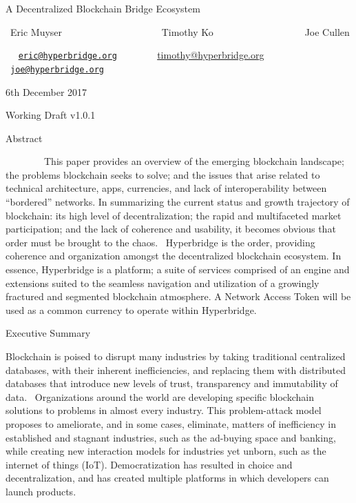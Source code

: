 \documentclass[]{article}
\date{}
\begin{document}
{A Decentralized Blockchain Bridge Ecosystem}

{}

{~Eric Muyser ~ ~ ~ ~ ~ ~ ~ ~ ~ ~ ~ ~ Timothy Ko ~ ~ ~ ~ ~ ~ ~ ~ ~ ~ ~
Joe Cullen}

{~
~}{\href{mailto:eric@hyperbridge.org}{\nolinkurl{eric@hyperbridge.org}}}{~
~ ~ ~ ~ }{\href{mailto:tim@hyperbridge.org}{timothy@hyperbridge.org}}{~
~ ~ ~
~}{\href{mailto:joe@hyperbridge.org}{\nolinkurl{joe@hyperbridge.org}}}{~}

{}

{6th December 2017}

{Working Draft v1.0.1}

{}

{Abstract}

{}

{~~~~~~~~This paper provides an overview of the emerging blockchain
landscape; the problems blockchain seeks to solve; and the issues that
arise related to technical architecture, apps, currencies, and lack of
interoperability between ``bordered'' networks. In summarizing the
current status and growth trajectory of blockchain: its high level of
decentralization; the rapid and multifaceted market participation; and
the lack of coherence and usability, it becomes obvious that order must
be brought to the chaos. ~Hyperbridge is the order, providing coherence
and organization amongst the decentralized blockchain ecosystem. In
essence, Hyperbridge is a platform; a suite of services comprised of an
engine and extensions suited to the seamless navigation and utilization
of a growingly fractured and segmented blockchain atmosphere. A Network
Access Token will be used as a common currency to operate within
Hyperbridge.}

{}

{Executive Summary}

{}

{Blockchain is poised to disrupt many industries by taking traditional
centralized databases, with their inherent inefficiencies, and replacing
them with distributed databases that introduce new levels of trust,
transparency and immutability of data. ~Organizations around the world
are developing specific blockchain solutions to problems in almost every
industry. This problem-attack model proposes to ameliorate, and in some
cases, eliminate, matters of inefficiency in established and stagnant
industries, such as the ad-buying space and banking, while creating new
interaction models for industries yet unborn, such as the internet of
things (IoT). Democratization has resulted in choice and
decentralization, and has created multiple platforms in which developers
can launch products. }
\end{document}
